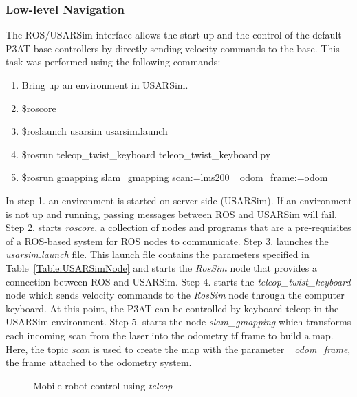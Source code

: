 \subsubsection*{Low-level Navigation}
The ROS/USARSim interface allows the start-up and the control of the default P3AT base controllers by directly sending velocity commands to the base. This task was performed using the following commands:
\begin{enumerate}
\item\footnotesize{Bring up an environment in USARSim.        }
\item\footnotesize{\$roscore}
\item\footnotesize{\$roslaunch usarsim usarsim.launch}
\item\footnotesize{\$rosrun teleop\_twist\_keyboard teleop\_twist\_keyboard.py}
\item\footnotesize{\$rosrun gmapping slam\_gmapping scan:=lms200 \_odom\_frame:=odom}
\end{enumerate}

In step 1. an environment is started on server side (USARSim). If an environment is not up and running, passing messages between ROS and USARSim will fail. Step 2. starts {\it roscore}, a collection of nodes and programs that are a pre-requisites of a ROS-based system for ROS nodes to communicate. Step 3. launches the {\it usarsim.launch} file. This launch file contains the parameters specified in Table~\ref{Table:USARSimNode} and starts the {\it RosSim} node that provides a connection between ROS and USARSim. Step 4. starts the {\it teleop\_twist\_keyboard} node which sends velocity commands to the {\it RosSim} node through the computer keyboard. At this point, the P3AT can be controlled by keyboard teleop in the USARSim environment. Step 5. starts the node {\it slam\_gmapping} which transforms each incoming scan from the laser into the odometry tf frame to build a map. Here, the topic {\it scan} is used to create the map with the parameter {\it \_odom\_frame}, the frame attached to the odometry system.


\begin{figure}[t!]
\centering
{}
\caption{\label{fig:teleop}Mobile robot control using {\it teleop}}
\end{figure}


